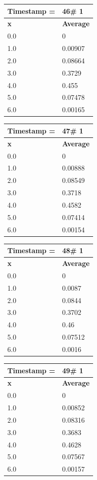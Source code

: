 \begin{tabular}{|l||l|}
\hline
\textbf{Timestamp =} & \textbf{46}\# 1\\\hline
	\textbf{x} & \textbf{Average} \\ \hline
\hline
	0.0 & 0 \\ \hline
	1.0 & 0.00907 \\ \hline
	2.0 & 0.08664 \\ \hline
	3.0 & 0.3729 \\ \hline
	4.0 & 0.455 \\ \hline
	5.0 & 0.07478 \\ \hline
	6.0 & 0.00165 \\ \hline
\end{tabular}
\begin{tabular}{|l||l|}
\hline
\textbf{Timestamp =} & \textbf{47}\# 1\\\hline
	\textbf{x} & \textbf{Average} \\ \hline
\hline
	0.0 & 0 \\ \hline
	1.0 & 0.00888 \\ \hline
	2.0 & 0.08549 \\ \hline
	3.0 & 0.3718 \\ \hline
	4.0 & 0.4582 \\ \hline
	5.0 & 0.07414 \\ \hline
	6.0 & 0.00154 \\ \hline
\end{tabular}

\begin{tabular}{|l||l|}
\hline
\textbf{Timestamp =} & \textbf{48}\# 1\\\hline
	\textbf{x} & \textbf{Average} \\ \hline
\hline
	0.0 & 0 \\ \hline
	1.0 & 0.0087 \\ \hline
	2.0 & 0.0844 \\ \hline
	3.0 & 0.3702 \\ \hline
	4.0 & 0.46 \\ \hline
	5.0 & 0.07512 \\ \hline
	6.0 & 0.0016 \\ \hline
\end{tabular}
\begin{tabular}{|l||l|}
\hline
\textbf{Timestamp =} & \textbf{49}\# 1\\\hline
	\textbf{x} & \textbf{Average} \\ \hline
\hline
	0.0 & 0 \\ \hline
	1.0 & 0.00852 \\ \hline
	2.0 & 0.08316 \\ \hline
	3.0 & 0.3683 \\ \hline
	4.0 & 0.4628 \\ \hline
	5.0 & 0.07567 \\ \hline
	6.0 & 0.00157 \\ \hline
\end{tabular}

